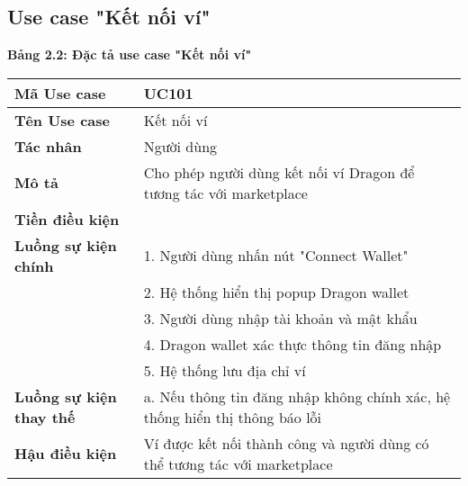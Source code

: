 \subsection{Use case "Kết nối ví"}
\textbf{Bảng 2.2: Đặc tả use case "Kết nối ví"}
\renewcommand{\arraystretch}{1.5}
\begin{tabular}{|l|p{10cm}|}
    \hline
    \rule{0pt}{3ex}\textbf{Mã Use case} & UC101 \\
    \hline
    \rule{0pt}{3ex}\textbf{Tên Use case} & Kết nối ví \\
    \hline
    \rule{0pt}{3ex}\textbf{Tác nhân} & Người dùng \\
    \hline
    \rule{0pt}{3ex}\textbf{Mô tả} & Cho phép người dùng kết nối ví Dragon để tương tác với marketplace \\
    \hline
    \rule{0pt}{3ex}\textbf{Tiền điều kiện} &  \\
    \hline
    \rule{0pt}{3ex}\textbf{Luồng sự kiện chính} & 1. Người dùng nhấn nút "Connect Wallet" \\
    & 2. Hệ thống hiển thị popup Dragon wallet \\
    & 3. Người dùng nhập tài khoản và mật khẩu \\
    & 4. Dragon wallet xác thực thông tin đăng nhập \\
    & 5. Hệ thống lưu địa chỉ ví\\
    \hline
    \rule{0pt}{3ex}\textbf{Luồng sự kiện thay thế} & a. Nếu thông tin đăng nhập không chính xác, hệ thống hiển thị thông báo lỗi \\
    \hline
    \rule{0pt}{3ex}\textbf{Hậu điều kiện} & Ví được kết nối thành công và người dùng có thể tương tác với marketplace \\
    \hline
\end{tabular}


